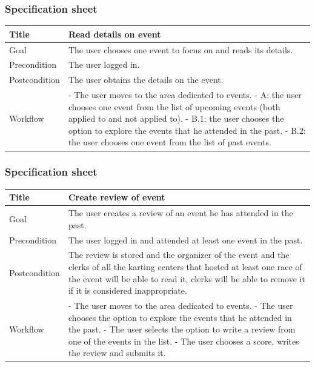 \documentclass{beamer}
\begin{document}
\begin{frame}
    \frametitle{Specification sheet}
    \begin{table}
        \tiny
        \begin{tabular}{|p{2cm}|p{6cm}|}
        \hline
        Title & \textbf{Read details on event} \\
        \hline
        Goal & The user chooses one event to focus on and reads its details. \\
        \hline
        Precondition & The user logged in. \\
        \hline
        Postcondition & The user obtains the details on the event. \\
        \hline
        Workflow &
        - The user moves to the area dedicated to events. \newline
        - A: the user chooses one event from the list of upcoming events (both applied to and not applied to). \newline
        - B.1: the user chooses the option to explore the events that he attended in the past. \newline
        - B.2: the user chooses one event from the list of past events. \\
        \hline
        \end{tabular}
    \end{table}
\end{frame}

\begin{frame}
    \frametitle{Specification sheet}
    \begin{table}
        \tiny
        \begin{tabular}{|p{2cm}|p{6cm}|}
        \hline
        Title & \textbf{Create review of event} \\
        \hline
        Goal & The user creates a review of an event he has attended in the past. \\
        \hline
        Precondition & The user logged in and attended at least one event in the past. \\
        \hline
        Postcondition & The review is stored and the organizer of the event and the clerks of all the 
        karting centers that hosted at least one race of the event will be able to read it, clerks will 
        be able to remove it if it is considered inappropriate. \\
        \hline
        Workflow &
        - The user moves to the area dedicated to events. \newline
        - The user chooses the option to explore the events that he attended in the past. \newline
        - The user selects the option to write a review from one of the events in the list. \newline
        - The user chooses a score, writes the review and submits it. \\
        \hline
        \end{tabular}
    \end{table}
\end{frame}
\end{document}
